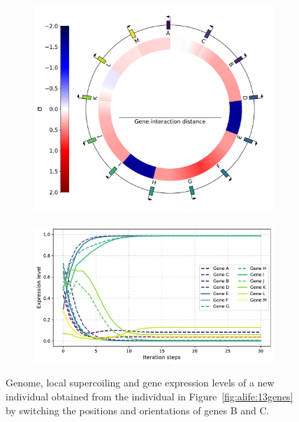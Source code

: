 \begin{figure}[H]
\centering
\begin{subfigure}[t]{0.42\textwidth}
\includegraphics[width=\textwidth]{alife/img/inversion_genome.pdf}
\label{subfig:alife:inversion_genome}
\end{subfigure}
\begin{subfigure}[t]{0.56\textwidth}
\includegraphics[width=\textwidth]{alife/img/inversion_expr_level.pdf}
\label{subfig:alife:inversion_expr}
\end{subfigure}
\caption[Effect of a genomic inversion on the example individual in Figure~\ref{fig:alife:13genes}]{Genome, local supercoiling and gene expression levels of a new individual obtained from the individual in Figure~\ref{fig:alife:13genes} by switching the positions and orientations of genes B and C.}
\label{fig:alife:inversion}
\end{figure}

